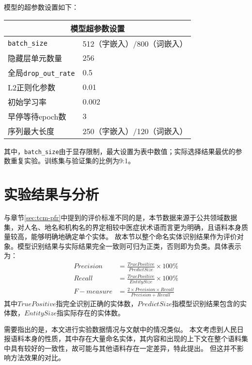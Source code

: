 模型的超参数设置如下：
\begin{table}[H]
    \centering
    \begin{tabular}{ll}
        \toprule
        \multicolumn{2}{c}{模型超参数设置} \\
        \midrule
        \verb|batch_size| & 512（字嵌入）/800（词嵌入） \\
        隐藏层单元数量 & 256\\
        全局\verb|drop_out_rate| & 0.5 \\
        L2正则化参数 & 0.01 \\
        初始学习率 & 0.002 \\
        早停等待epoch数 & 3\\
        序列最大长度 & 250（字嵌入）/120（词嵌入）\\
        \bottomrule
    \end{tabular}
\end{table}
其中，\verb|batch_size|由于显存限制，最大设置为表中数值；实际选择结果最优的参数重复实验。训练集与验证集的比例为9:1。

\section{实验结果与分析}
与章节\ref{sec:tcm-pfr}中提到的评价标准不同的是，本节数据来源于公共领域数据集，对人名、地名和机构名的界定相较中医症状术语而言更为明确，且语料本身质量较高，能够明确地确定单个实体。
故本节以整个命名实体识别结果作为评价对象。模型识别结果与实际结果完全一致则可归为正类，否则即为负类。具体表示为：
\begin{align}
    Precision &= \frac{True Positive}{Predict Size} \times 100\% \\
    Recall &= \frac{True Positive}{Entity Size} \times 100\% \\
    F-measure &= \frac{2\times Precision \times Recall}{Precision + Recall}
\end{align}
其中$True Positive$指完全识别正确的实体数，$Predict Size$指模型识别结果包含的实体数，$Entity Size$指实际存在的实体数。

需要指出的是，本文进行实验数据情况与文献中的情况类似。
本文考虑到人民日报语料本身的性质，其中存在大量命名实体，其内容和出现的上下文在整个语料集中具有较好的一致性，故可能与其他语料存在一定差异，特此提出。
但这并不影响方法效果的对比。

